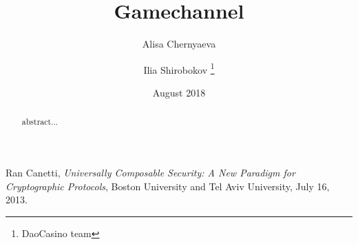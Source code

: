 \documentclass[tikz, 12pt]{article}
\title {Gamechannel}
\author {Alisa Chernyaeva \and Ilia Shirobokov \thanks{DaoCasino team}}
\date {August 2018}
\theoremstyle{definition}
\theoremstyle{remark}
\begin{document}
\maketitle
	\begin{abstract}
abstract...
	\end{abstract}
\tableofcontents	
	
	
		


	\begin{thebibliography}{9}
Ran Canetti, \emph{Universally Composable Security: A New Paradigm for Cryptographic Protocols}, Boston University and Tel Aviv University, July 16, 2013.
\end{thebibliography}


		
\end{document}
